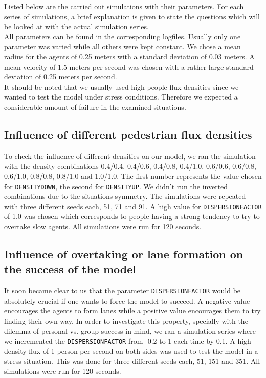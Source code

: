 
\noi Listed below are the carried out simulations with their parameters. For each series of simulations, a brief explanation is given to state the questions which will be looked at with the actual simulation series.\\
All parameters can be found in the corresponding logfiles. Usually only one parameter was varied while all others were kept constant. We chose a mean radius for the agents of 0.25 meters with a standard deviation of 0.03 meters. A mean velocity of 1.5 meters per second was chosen with a rather large standard deviation of 0.25 meters per second.\\
It should be noted that we usually used high people flux densities since we wanted to test the model under stress conditions. Therefore we expected a considerable amount of failure in the examined situations.

\subsection{Influence of different pedestrian flux densities}
To check the influence of different densities on our model, we ran the simulation with the density combinations 0.4/0.4, 0.4/0.6, 0.4/0.8, 0.4/1.0, 0.6/0.6, 0.6/0.8, 0.6/1.0, 0.8/0.8, 0.8/1.0 and 1.0/1.0. The first number represents the value chosen for \texttt{DENSITYDOWN}, the second for \texttt{DENSITYUP}. We didn't run the inverted combinations due to the situations symmetry. The simulations were repeated with three different seeds each, 51, 71 and 91. A high value for \texttt{DISPERSIONFACTOR} of 1.0 was chosen which corresponds to people having a strong tendency to try to overtake slow agents. All simulations were run for 120 seconds.

\subsection{Influence of overtaking or lane formation on the success of the model}
It soon became clear to us that the parameter \texttt{DISPERSIONFACTOR} would be absolutely crucial if one wants to force the model to succeed. A negative value encourages the agents to form lanes while a positive value encourages them to try finding their own way. In order to investigate this property, specially with the dilemma of personal vs. group success in mind, we ran a simulation series where we incremented the \texttt{DISPERSIONFACTOR} from -0.2 to 1 each time by 0.1. A high density flux of 1 person per second on both sides was used to test the model in a stress situation. This was done for three different seeds each, 51, 151 and 351. All simulations were run for 120 seconds.


